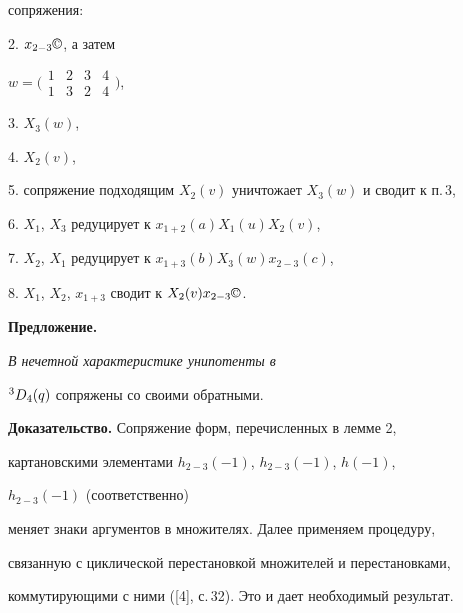 сопряжения: 


 


2. $x_{2-3}\text{\copyright}$, а затем 


$w=\big(\begin{smallmatrix} 1 & 2 & 3 & 4 \\ 1 & 3 &  2 & 


4\end{smallmatrix}\big)$, 


 


3. $X_3(w)$, 


 


4. $X_2(v)$, 


 


5. сопряжение подходящим $X_2(v)$ уничтожает $X_3(w)$ и сводит к п.\,3, 


 


6. $X_1$, $X_3$ редуцирует к $x_{1+2}(a)X_1(u)X_2(v)$, 


 


7. $X_2$, $X_1$ редуцирует к $x_{1+3}(b)X_3(w)x_{2-3}(c)$, 


 


8. $X_1$, $X_2$, $x_{1+3}$ сводит к $X_2(v)x_{2-3}\text{\copyright}$. 


\medskip 


 


{\bf Предложение.} {\it В нечетной характеристике унипотенты в 


${}^3D_4(q)$ сопряжены со своими обратными. 


} 


\medskip 


 


{\bf Доказательство.} Сопряжение форм, перечисленных в лемме 2,  


картановскими элементами $h_{2-3}(-1)$, $h_{2-3}(-1)$, $h(-1)$, 


$h_{2-3}(-1)$ (соответственно)  


меняет знаки аргументов в множителях. Далее применяем процедуру,  


связанную с циклической перестановкой множителей и перестановками, 


коммутирующими с ними ([4], с.\,32). Это и дает необходимый результат. 


